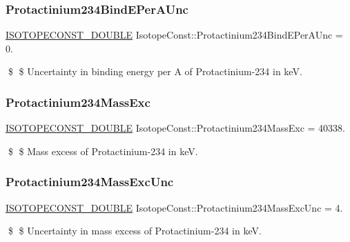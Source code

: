 \subsubsection{\texorpdfstring{Protactinium234\+Bind\+E\+Per\+A\+Unc}{Protactinium234BindEPerAUnc}}
{\footnotesize\ttfamily \mbox{\hyperlink{group___isotope_const-_macros_ga8f45a7272ce02c0b4c65c44636ed719a}{I\+S\+O\+T\+O\+P\+E\+C\+O\+N\+S\+T\+\_\+\+D\+O\+U\+B\+LE}} Isotope\+Const\+::\+Protactinium234\+Bind\+E\+Per\+A\+Unc = 0.}

\$ \$ Uncertainty in binding energy per A of Protactinium-\/234 in keV. \mbox{\label{group___isotope_const-_protactinium-_pa234_ga911c6e6843833c15ec16f91eaacf962d}} 
\subsubsection{\texorpdfstring{Protactinium234\+Mass\+Exc}{Protactinium234MassExc}}
{\footnotesize\ttfamily \mbox{\hyperlink{group___isotope_const-_macros_ga8f45a7272ce02c0b4c65c44636ed719a}{I\+S\+O\+T\+O\+P\+E\+C\+O\+N\+S\+T\+\_\+\+D\+O\+U\+B\+LE}} Isotope\+Const\+::\+Protactinium234\+Mass\+Exc = 40338.}

\$ \$ Mass excess of Protactinium-\/234 in keV. \mbox{\label{group___isotope_const-_protactinium-_pa234_ga9db7162bce07e4a0cbc018c95d6782c1}} 
\subsubsection{\texorpdfstring{Protactinium234\+Mass\+Exc\+Unc}{Protactinium234MassExcUnc}}
{\footnotesize\ttfamily \mbox{\hyperlink{group___isotope_const-_macros_ga8f45a7272ce02c0b4c65c44636ed719a}{I\+S\+O\+T\+O\+P\+E\+C\+O\+N\+S\+T\+\_\+\+D\+O\+U\+B\+LE}} Isotope\+Const\+::\+Protactinium234\+Mass\+Exc\+Unc = 4.}

\$ \$ Uncertainty in mass excess of Protactinium-\/234 in keV. \mbox{\label{group___isotope_const-_protactinium-_pa234_gabb63af99083481ecf1c6d6937fe61ce3}} 
